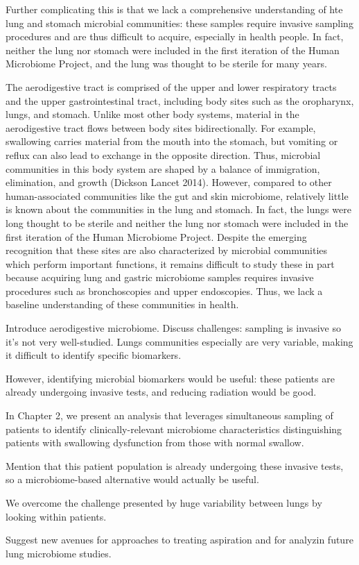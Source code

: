 Further complicating this is that we lack a comprehensive understanding of hte lung and stomach microbial communities: these samples require invasive sampling procedures and are thus difficult to acquire, especially in health people.
In fact, neither the lung nor stomach were included in the first iteration of the Human Microbiome Project, and the lung was thought to be sterile for many years.

The aerodigestive tract is comprised of the upper and lower respiratory tracts and the upper gastrointestinal tract, including body sites such as the oropharynx, lungs, and stomach.
Unlike most other body systems, material in the aerodigestive tract flows between body sites bidirectionally.
For example, swallowing carries material from the mouth into the stomach, but vomiting or reflux can also lead to exchange in the opposite direction.
Thus, microbial communities in this body system are shaped by a balance of immigration, elimination, and growth (Dickson Lancet 2014).
However, compared to other human-associated communities like the gut and skin microbiome, relatively little is known about the communities in the lung and stomach.
In fact, the lungs were long thought to be sterile and neither the lung nor stomach were included in the first iteration of the Human Microbiome Project.
Despite the emerging recognition that these sites are also characterized by microbial communities which perform important functions, it remains difficult to study these in part because acquiring lung and gastric microbiome samples requires invasive procedures such as bronchoscopies and upper endoscopies.
Thus, we lack a baseline understanding of these communities in health.

Introduce aerodigestive microbiome. Discuss challenges: sampling is invasive so it's not very well-studied. Lungs communities especially are very variable, making it difficult to identify specific biomarkers.

However, identifying microbial biomarkers would be useful: these patients are already undergoing invasive tests, and reducing radiation would be good.

In Chapter 2, we present an analysis that leverages simultaneous sampling of patients to identify clinically-relevant microbiome characteristics distinguishing patients with swallowing dysfunction from those with normal swallow.

Mention that this patient population is already undergoing these invasive tests, so a microbiome-based alternative would actually be useful.

We overcome the challenge presented by huge variability between lungs by looking within patients.

Suggest new avenues for approaches to treating aspiration and for analyzin future lung microbiome studies.



\begin{singlespace}


\end{singlespace}
